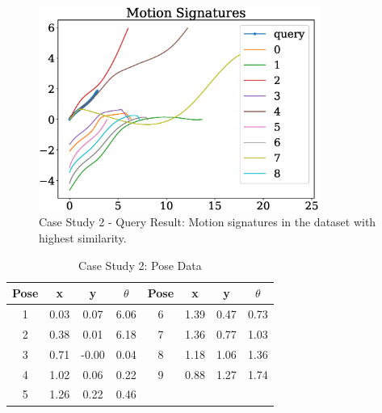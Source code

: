 \documentclass[twocolumn,10pt]{asme2e}
\begin{document}
\begin{figure}
\centering
\includegraphics[width=260pt]{figure/fig_ex_motion_signatures.eps}
  \caption{Case Study 2 - Query Result: Motion signatures in the dataset with highest similarity.}
\label{queryResult}
\end{figure}


\begin{table}
\caption{Case Study 2: Pose Data}
\centering
\label{poseData}
\begin{tabular}{cccccccc}
\hline
Pose & x & y & $\theta$ & Pose & x & y & $\theta$ \\
\hline
1 & 0.03 & 0.07 & 6.06 & 6 & 1.39 & 0.47 & 0.73 \\
2 & 0.38 & 0.01 & 6.18 & 7 & 1.36 & 0.77 & 1.03 \\
3 & 0.71 &-0.00 & 0.04 & 8 & 1.18 & 1.06 & 1.36 \\
4 & 1.02 & 0.06 & 0.22 & 9 & 0.88 & 1.27 & 1.74 \\
5 & 1.26 & 0.22 & 0.46 & \\
\end{tabular}
\end{table}
\end{document}
